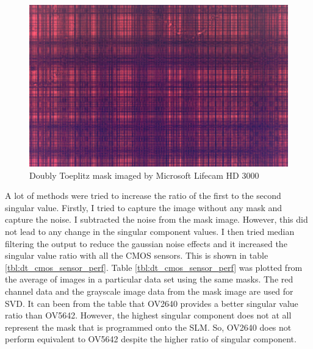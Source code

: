 \begin{figure}[h]
\centering
\includegraphics[scale=0.25]{pics/slm/lifecamdtmask.png}
\caption{Doubly Toeplitz mask imaged by Microsoft Lifecam HD 3000}
\label{fig:dt_lifecam}
\end{figure}
A lot of methods were tried to increase the ratio of the first to the second singular value. Firstly, I tried to capture the image without any mask and capture the noise. I subtracted the noise from the mask image. However, this did not lead to any change in the singular component values. I then tried median filtering the output to reduce the gaussian noise effects and it increased the singular value ratio with all the CMOS sensors. This is shown in table \ref{tbl:dt_cmos_sensor_perf}. Table \ref{tbl:dt_cmos_sensor_perf} was plotted from the average of images in a particular data set using the same masks. The red channel data and the grayscale image data from the mask image are used for SVD. 
It can been from the table that OV2640 provides a better singular value ratio than OV5642. However, the highest singular component does not at all represent the mask that is programmed onto the SLM. So, OV2640 does not perform equivalent to OV5642 despite the higher ratio of singular component.
